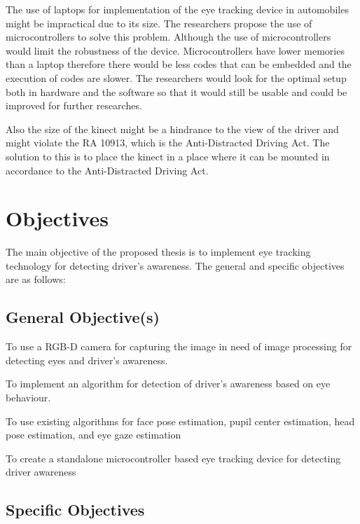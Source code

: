 The use of laptops for implementation of the eye tracking device in automobiles might be impractical due to its size. The researchers propose the use of microcontrollers to solve this problem. Although the use of microcontrollers would limit the robustness of the device. Microcontrollers have lower memories than a laptop therefore there would be less codes that can be embedded and the execution of codes are slower. The researchers would look for the optimal setup both in hardware and the software so that it would still be usable and could be improved for further researches.

Also the size of the kinect might be a hindrance to the view of the driver and might violate the RA 10913, which is the Anti-Distracted Driving Act. The solution to this is to place the kinect in a place where it can be mounted in accordance to the Anti-Distracted Driving Act.


\section{Objectives}

The main objective of the proposed thesis is to implement eye tracking technology for detecting driver’s awareness. The general and specific objectives are as follows:

\subsection{General Objective(s)}
To use a RGB-D camera for capturing the image in need of image processing for detecting eyes and driver’s awareness.

To implement an algorithm for detection of driver’s awareness based on eye behaviour.

To use existing algorithms for face pose estimation, pupil center estimation, head pose estimation, and eye gaze estimation

To create a standalone microcontroller based eye tracking device for detecting driver awareness


\subsection{Specific Objectives}

